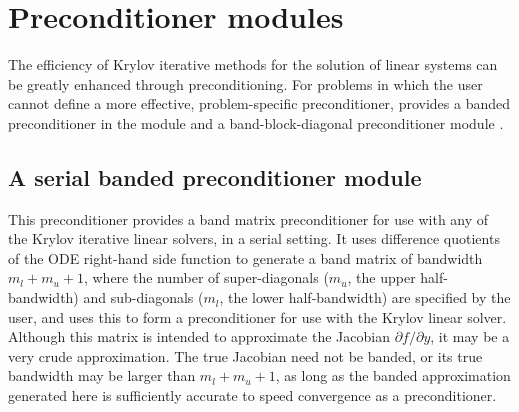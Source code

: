 \section{Preconditioner modules}\label{ss:preconds}

The efficiency of Krylov iterative methods for the solution of linear systems 
can be greatly enhanced through preconditioning. For problems in which the 
user cannot define a more effective, problem-specific preconditioner,
{\cvode} provides a banded preconditioner in the module {\cvbandpre} and
a band-block-diagonal preconditioner module {\cvbbdpre}.

\subsection{A serial banded preconditioner module}\label{sss:cvbandpre}


This preconditioner provides a band matrix preconditioner for use with
any of the Krylov iterative linear solvers, in a serial setting.
It uses difference quotients of the ODE right-hand side function  to
generate a band matrix of bandwidth $m_l + m_u + 1$, where the number of
super-diagonals ($m_u$, the upper half-bandwidth) and sub-diagonals
($m_l$, the lower half-bandwidth) are specified by the user, and uses this to
form a preconditioner for use with the Krylov linear solver.
Although this matrix is intended to approximate the Jacobian
$\partial f / \partial y$, it may be a very crude approximation.  The true Jacobian
need not be banded, or its true bandwidth may be larger than $m_l + m_u + 1$, as
long as the banded approximation generated here is sufficiently accurate to
speed convergence as a preconditioner. 

